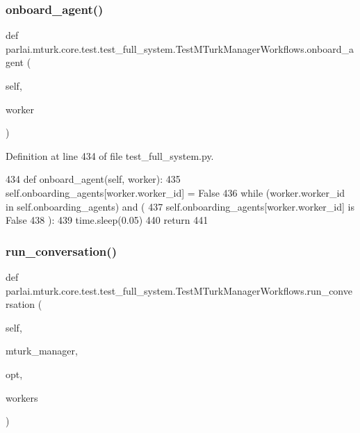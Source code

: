 \subsubsection{\texorpdfstring{onboard\+\_\+agent()}{onboard\_agent()}}
{\footnotesize\ttfamily def parlai.\+mturk.\+core.\+test.\+test\+\_\+full\+\_\+system.\+Test\+M\+Turk\+Manager\+Workflows.\+onboard\+\_\+agent (\begin{DoxyParamCaption}\item[{}]{self,  }\item[{}]{worker }\end{DoxyParamCaption})}



Definition at line 434 of file test\+\_\+full\+\_\+system.\+py.


\begin{DoxyCode}
434     \textcolor{keyword}{def }onboard\_agent(self, worker):
435         self.onboarding\_agents[worker.worker\_id] = \textcolor{keyword}{False}
436         \textcolor{keywordflow}{while} (worker.worker\_id \textcolor{keywordflow}{in} self.onboarding\_agents) \textcolor{keywordflow}{and} (
437             self.onboarding\_agents[worker.worker\_id] \textcolor{keywordflow}{is} \textcolor{keyword}{False}
438         ):
439             time.sleep(0.05)
440         \textcolor{keywordflow}{return}
441 
\end{DoxyCode}
\mbox{\label{classparlai_1_1mturk_1_1core_1_1test_1_1test__full__system_1_1TestMTurkManagerWorkflows_abe32bc53e3e76d2db1bf52045fa15707}} 
\subsubsection{\texorpdfstring{run\+\_\+conversation()}{run\_conversation()}}
{\footnotesize\ttfamily def parlai.\+mturk.\+core.\+test.\+test\+\_\+full\+\_\+system.\+Test\+M\+Turk\+Manager\+Workflows.\+run\+\_\+conversation (\begin{DoxyParamCaption}\item[{}]{self,  }\item[{}]{mturk\+\_\+manager,  }\item[{}]{opt,  }\item[{}]{workers }\end{DoxyParamCaption})}



